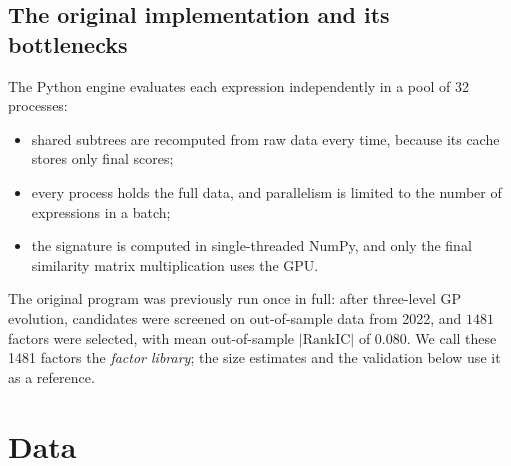 \documentclass[11pt,a4paper]{article}
\begin{document}
\subsection{The original implementation and its bottlenecks}
\label{sec:legacy}
The Python engine evaluates each expression independently in a pool of 32 processes:
\begin{itemize}[nosep]
  \item shared subtrees are recomputed from raw data every time, because its cache stores only final scores;
  \item every process holds the full data, and parallelism is limited to the number of expressions in a batch;
  \item the signature is computed in single-threaded NumPy, and only the final similarity matrix multiplication uses the GPU.
\end{itemize}
The original program was previously run once in full: after three-level GP evolution, candidates were screened on out-of-sample data from 2022, and $1481$ factors were selected, with mean out-of-sample $|\mathrm{RankIC}|$ of $0.080$. We call these 1481 factors the \emph{factor library}; the size estimates and the validation below use it as a reference.

\section{Data}
\end{document}
